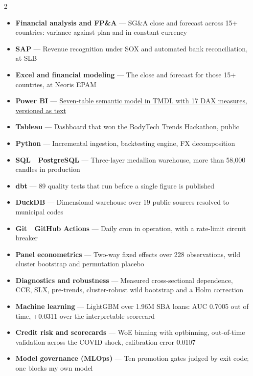 \documentclass[a4paper,10pt]{article}
\begin{document}
\begin{multicols}{2}
\begin{itemize}[leftmargin=1.1em, itemsep=1pt, topsep=0pt, parsep=0pt]
  \item \textbf{\color{ink}Financial analysis and FP\&A} --- SG\&A close and forecast across 15+ countries: variance against plan and in constant currency
  \item \textbf{\color{ink}SAP} --- Revenue recognition under SOX and automated bank reconciliation, at SLB
  \item \textbf{\color{ink}Excel and financial modeling} --- The close and forecast for those 15+ countries, at Neoris EPAM
  \item \textbf{\color{ink}Power BI} --- \href{https://davirson.com/en/projects/powerbi}{Seven-table semantic model in TMDL with 17 DAX measures, versioned as text}
  \item \textbf{\color{ink}Tableau} --- \href{https://public.tableau.com/app/profile/davirson.novoa/viz/BodyTrendsADataAnalysisProject/TrendsAnalysis}{Dashboard that won the BodyTech Trends Hackathon, public}
  \item \textbf{\color{ink}Python} --- Incremental ingestion, backtesting engine, FX decomposition
  \item \textbf{\color{ink}SQL \,\textperiodcentered\, PostgreSQL} --- Three-layer medallion warehouse, more than 58,000 candles in production
  \item \textbf{\color{ink}dbt} --- 89 quality tests that run before a single figure is published
  \item \textbf{\color{ink}DuckDB} --- Dimensional warehouse over 19 public sources resolved to municipal codes
  \item \textbf{\color{ink}Git \,\textperiodcentered\, GitHub Actions} --- Daily cron in operation, with a rate-limit circuit breaker
  \item \textbf{\color{ink}Panel econometrics} --- Two-way fixed effects over 228 observations, wild cluster bootstrap and permutation placebo
  \item \textbf{\color{ink}Diagnostics and robustness} --- Measured cross-sectional dependence, CCE, SLX, pre-trends, cluster-robust wild bootstrap and a Holm correction
  \item \textbf{\color{ink}Machine learning} --- LightGBM over 1.96M SBA loans: AUC 0.7005 out of time, +0.0311 over the interpretable scorecard
  \item \textbf{\color{ink}Credit risk and scorecards} --- WoE binning with optbinning, out-of-time validation across the COVID shock, calibration error 0.0107
  \item \textbf{\color{ink}Model governance (MLOps)} --- Ten promotion gates judged by exit code; one blocks my own model
\end{itemize}
\end{multicols}
\end{document}
